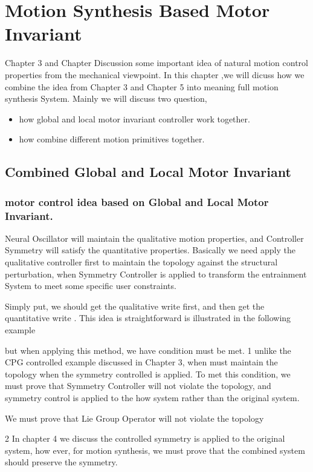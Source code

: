 \chapter {Motion Synthesis Based Motor Invariant}
Chapter 3 and Chapter Discussion some important idea of natural motion control properties from the mechanical viewpoint.
In this chapter ,we will dicuss how we combine the idea from Chapter 3 and Chapter 5 into meaning full motion synthesis System.
Mainly we will discuss two question,
\begin{itemize}
\item how global and local motor invariant controller work together.
\item how combine different motion primitives together.
\end{itemize}

\section{Combined Global and Local Motor Invariant}

\subsection{ motor control idea based on Global and Local  Motor Invariant.}

Neural Oscillator will maintain the qualitative motion properties, and Controller Symmetry will satisfy the quantitative properties.
Basically we need apply the qualitative controller first to maintain the topology against the structural perturbation, 
when Symmetry Controller is applied to transform the entrainment System to meet some specific user constraints.


Simply put, we should get the qualitative write first, and then get the quantitative write .
This idea is straightforward is illustrated in the following example


but when applying this method, we have condition must be met.
1 unlike the CPG controlled example discussed in Chapter 3, when must maintain the topology when the symmetry controlled is applied.
To met this condition, we must prove that Symmetry Controller will not violate the topology, and symmetry control is applied to the how system rather than the original system.

We must prove that Lie Group Operator will not violate the topology

2 In chapter 4 we discuss the controlled symmetry is applied to the original system, how ever, for motion synthesis, we must prove that the combined system should preserve the symmetry.

